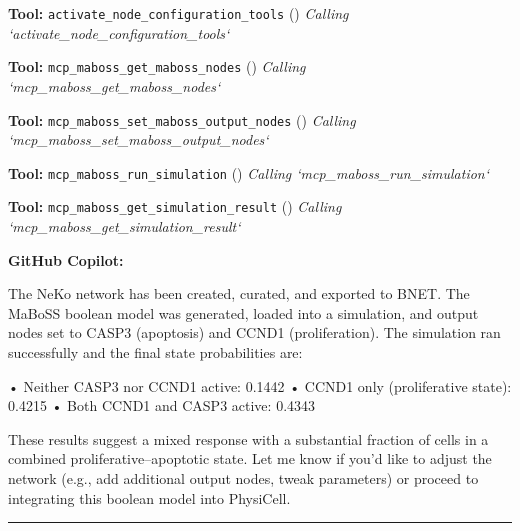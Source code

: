 \documentclass[11pt,a4paper]{article}
\begin{document}
\begin{toolokbox}
\textbf{Tool:} \texttt{activate\_node\_configuration\_tools} (\checkmark)
\textit{Calling `activate\_node\_configuration\_tools`}
\end{toolokbox}
\begin{toolokbox}
\textbf{Tool:} \texttt{mcp\_maboss\_get\_maboss\_nodes} (\checkmark)
\textit{Calling `mcp\_maboss\_get\_maboss\_nodes`}
\end{toolokbox}
\begin{toolokbox}
\textbf{Tool:} \texttt{mcp\_maboss\_set\_maboss\_output\_nodes} (\checkmark)
\textit{Calling `mcp\_maboss\_set\_maboss\_output\_nodes`}
\end{toolokbox}
\begin{toolokbox}
\textbf{Tool:} \texttt{mcp\_maboss\_run\_simulation} (\checkmark)
\textit{Calling `mcp\_maboss\_run\_simulation`}
\end{toolokbox}
\begin{toolokbox}
\textbf{Tool:} \texttt{mcp\_maboss\_get\_simulation\_result} (\checkmark)
\textit{Calling `mcp\_maboss\_get\_simulation\_result`}
\end{toolokbox}
\begin{copilotbox}
\textbf{GitHub Copilot:}

The NeKo network has been created, curated, and exported to BNET. The MaBoSS boolean model was generated, loaded into a simulation, and output nodes set to CASP3 (apoptosis) and CCND1 (proliferation). The simulation ran successfully and the final state probabilities are:

• Neither CASP3 nor CCND1 active: 0.1442  
• CCND1 only (proliferative state): 0.4215  
• Both CCND1 and CASP3 active: 0.4343

These results suggest a mixed response with a substantial fraction of cells in a combined proliferative–apoptotic state. Let me know if you’d like to adjust the network (e.g., add additional output nodes, tweak parameters) or proceed to integrating this boolean model into PhysiCell.

\end{copilotbox}
\bigskip\hrule\bigskip
\end{document}
